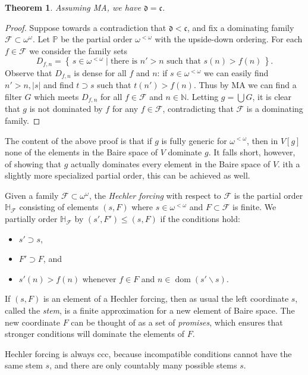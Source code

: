 \documentclass[11pt,oneside]{amsbook}
\newcommand{\set}[1]{\left\{\,#1\,\right\}}
\newcommand{\NN}{\mathbb N}
\newcommand{\PP}{\mathbb P}
\DeclareMathOperator{\dom}{dom}
\theoremstyle{definition}
\theoremstyle{plain}
\newtheorem{thm}{Theorem}[section]
\theoremstyle{definition}
\theoremstyle{remark}
\begin{document}
\begin{thm}
  \label{thm:ma-d}
  Assuming MA, we have $\mathfrak d=\mathfrak c$.
\end{thm}

\begin{proof}
  Suppose towards a contradiction that $\mathfrak d<\mathfrak c$, and fix a dominating family $\mathcal F\subset\omega^\omega$. Let $\PP$ be the partial order $\omega^{<\omega}$ with the upside-down ordering. For each $f\in\mathcal F$ we consider the family sets
  \[D_{f,n}=\set{s\in\omega^{<\omega}\mid\text{there is $n'>n$ such that $s(n)>f(n)$}}\text{.}
  \]
  Observe that $D_{f,n}$ is dense for all $f$ and $n$: if $s\in\omega^{<\omega}$ we can easily find $n'>n,|s|$ and find $t\supset s$ such that $t(n')>f(n)$. Thus by MA we can find a filter $G$ which meets $D_{f,n}$ for all $f\in\mathcal F$ and $n\in\NN$. Letting $g=\bigcup G$, it is clear that $g$ is not dominated by $f$ for any $f\in\mathcal F$, contradicting that $\mathcal F$ is a dominating family.
\end{proof}

The content of the above proof is that if $g$ is fully generic for $\omega^{<\omega}$, then in $V[g]$ none of the elements in the Baire space of $V$ dominate $g$. It falls short, however, of showing that $g$ actually dominates every element in the Baire space of $V$. ith a slightly more specialized partial order, this can be achieved as well.

Given a family $\mathcal F\subset\omega^\omega$, the \emph{Hechler forcing} with respect to $\mathcal F$ is the partial order $\mathbb H_{\mathcal F}$ consisting of elements $(s,F)$ where $s\in\omega^{<\omega}$ and $F\subset\mathcal F$ is finite. We partially order $\mathbb H_{\mathcal F}$ by $(s',F')\leq(s,F)$ if the conditions hold:
\begin{itemize}
\item $s'\supset s$,
\item $F'\supset F$, and
\item $s'(n)>f(n)$ whenever $f\in F$ and $n\in\dom(s'\smallsetminus s)$.
\end{itemize}
If $(s,F)$ is an element of a Hechler forcing, then as usual the left coordinate $s$, called the \emph{stem}, is a finite approximation for a new element of Baire space. The new coordinate $F$ can be thought of as a set of \emph{promises}, which ensures that stronger conditions will dominate the elements of $F$.

Hechler forcing is always ccc, because incompatible conditions cannot have the same stem $s$, and there are only countably many possible stems $s$.
\end{document}
